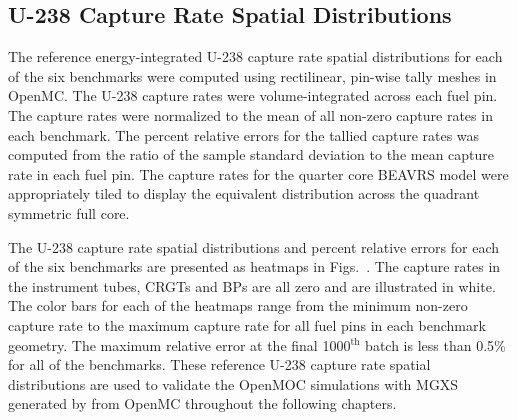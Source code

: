
\clearpage

\subsection{U-238 Capture Rate Spatial Distributions}
\label{subsec:chap7-capture-rates}

The reference energy-integrated U-238 capture rate spatial distributions for each of the six benchmarks were computed using rectilinear, pin-wise tally meshes in OpenMC. The U-238 capture rates were volume-integrated across each fuel pin. The capture rates were normalized to the mean of all non-zero capture rates in each benchmark. The percent relative errors for the tallied capture rates was computed from the ratio of the sample standard deviation to the mean capture rate in each fuel pin. The capture rates for the quarter core \ac{BEAVRS} model were appropriately tiled to display the equivalent distribution across the quadrant symmetric full core.

The U-238 capture rate spatial distributions and percent relative errors for each of the six benchmarks are presented as heatmaps in Figs.~. The capture rates in the instrument tubes, \acp{CRGT} and \acp{BP} are all zero and are illustrated in white. The color bars for each of the heatmaps range from the minimum non-zero capture rate to the maximum capture rate for all fuel pins in each benchmark geometry. The maximum relative error at the final 1000$^{\text{th}}$ batch is less than 0.5\% for all of the benchmarks. These reference U-238 capture rate spatial distributions are used to validate the OpenMOC simulations with \ac{MGXS} generated by from OpenMC throughout the following chapters.

